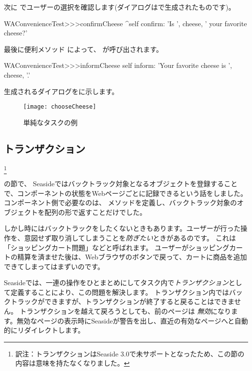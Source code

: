 \documentclass[a4paper,10pt,twoside]{book}
\begin{document}
次に  でユーザーの選択を確認します(ダイアログはで生成されたものです)。

\begin{code}{}
WAConvenienceTest>>>confirmCheese
	^self confirm: 'Is ', cheese,  ' your favorite cheese?'
\end{code}

最後に便利メソッド によって、 が呼び出されます。

\begin{code}{}
WAConvenienceTest>>>informCheese
	self inform: 'Your favorite cheese is ', cheese, '.'
\end{code}

生成されるダイアログをに示します。

\begin{figure}[ht]
\begin{center}
\texttt{[image: chooseCheese]}
\caption{単純なタスクの例}
\end{center}
\end{figure}

\subsection{トランザクション}
\footnote{訳注：トランザクションはSeaside 3.0で未サポートとなったため、この節の内容は意味を持たなくなりました。}

 の節で、 Seasideではバックトラック対象となるオブジェクトを登録することで、コンポーネントの状態をWebページごとに記録できるという話をしました。
コンポーネント側で必要なのは、 メソッドを定義し、バックトラック対象のオブジェクトを配列の形で返すことだけでした。

しかし時にはバックトラックをしたくないときもあります。ユーザーが行った操作を、意図せず取り消してしまうことを\emph{防ぎたい}ときがあるのです。
これは「ショッピングカート問題」などと呼ばれます。
ユーザーがショッピングカートの精算を済ませた後は、Webブラウザのボタンで戻って、カートに商品を追加できてしまってはまずいのです。

Seasideでは、一連の操作をひとまとめにしてタスク内で\emph{トランザクション}として定義することにより、この問題を解決します。
トランザクション内ではバックトラックができますが、トランザクションが終了すると戻ることはできません。
トランザクションを越えて戻ろうとしても、前のページは \emph{無効}になります。無効なページの表示時にSeasideが警告を出し、直近の有効なページへと自動的にリダイレクトします。
\end{document}
